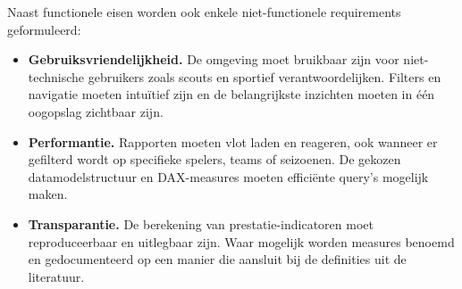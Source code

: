 Naast functionele eisen worden ook enkele niet-functionele requirements geformuleerd:

\begin{itemize}
  \item \textbf{Gebruiksvriendelijkheid.} De omgeving moet bruikbaar zijn voor niet-technische gebruikers zoals scouts en sportief verantwoordelijken. Filters en navigatie moeten intuïtief zijn en de belangrijkste inzichten moeten in één oogopslag zichtbaar zijn.
  \item \textbf{Performantie.} Rapporten moeten vlot laden en reageren, ook wanneer er gefilterd wordt op specifieke spelers, teams of seizoenen. De gekozen datamodelstructuur en DAX-measures moeten efficiënte query's mogelijk maken.
  \item \textbf{Transparantie.} De berekening van prestatie-indicatoren moet reproduceerbaar en uitlegbaar zijn. Waar mogelijk worden measures benoemd en gedocumenteerd op een manier die aansluit bij de definities uit de literatuur.
\end{itemize}